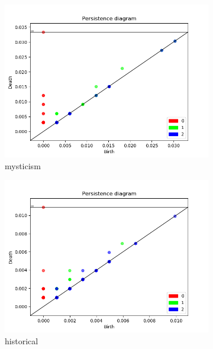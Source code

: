\documentclass[fleqn]{article}
\begin{document}
	\begin{figure}
		\begin{subfigure}[t]{0.425\textwidth}
			\includegraphics[width=\textwidth]{figures/all_words/mysticism.png}
			\caption{mysticism}
			\label{fig:all:mysticism}
		\end{subfigure}\hfill
		\begin{subfigure}[t]{0.425\textwidth}
			\includegraphics[width=\textwidth]{figures/all_words/hystorical.png}
			\caption{historical}
			\label{fig:all:historical}
		\end{subfigure}\hfill
		\\
		\begin{subfigure}[t]{0.425\textwidth}

\end{subfigure}
\end{figure}
\end{document}
